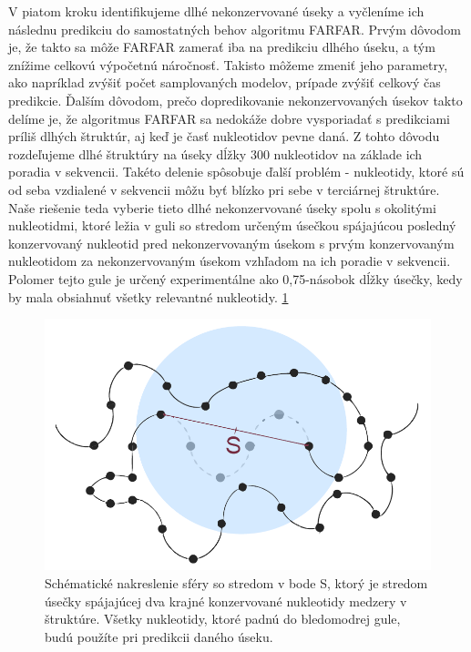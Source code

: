 \indent V piatom kroku identifikujeme dlhé nekonzervované úseky a vyčleníme ich následnu predikciu do samostatných behov algoritmu FARFAR. 
Prvým dôvodom je, že takto sa môže FARFAR zamerať iba na predikciu dlhého úseku, a tým znížime celkovú výpočetnú náročnosť. Takisto môžeme zmeniť jeho parametry, ako napríklad zvýšiť počet samplovaných modelov, prípade zvýšiť celkový čas predikcie. 
Ďalším dôvodom, prečo dopredikovanie nekonzervovaných úsekov takto delíme je, že algoritmus FARFAR sa nedokáže dobre vysporiadať s predikciami príliš dlhých štruktúr, aj keď je časť nukleotidov pevne daná. Z tohto dôvodu rozdeľujeme dlhé štruktúry na úseky dĺžky 300 nukleotidov na základe ich poradia v sekvencii. Takéto delenie spôsobuje ďalší problém - nukleotidy, ktoré sú od seba vzdialené v sekvencii môžu byť blízko pri sebe v terciárnej štruktúre. 
Naše riešenie teda vyberie tieto dlhé nekonzervované úseky spolu s okolitými nukleotidmi, ktoré ležia v guli so stredom určeným úsečkou spájajúcou posledný konzervovaný nukleotid pred nekonzervovaným úsekom s prvým konzervovaným nukleotidom za nekonzervovaným úsekom vzhľadom na ich poradie v sekvencii. Polomer tejto gule je určený experimentálne ako 0,75-násobok dĺžky úsečky, kedy by mala obsiahnuť všetky relevantné nukleotidy. \ref{obr3.2:sphere}

\begin{figure}%
\includegraphics[width=\textwidth]{../img/sphere}
\caption{Schématické nakreslenie sféry so stredom v bode S, ktorý je stredom úsečky spájajúcej dva krajné konzervované nukleotidy medzery v štruktúre. Všetky nukleotidy, ktoré padnú do bledomodrej gule, budú použíte pri predikcii daného úseku.}
\label{obr3.2:sphere}
\end{figure}

